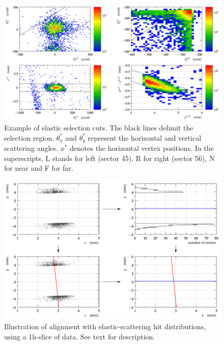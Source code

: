 \documentclass[TOTEM]{cern/cernphprep}
\begin{document}
\begin{figure}[h!]
\begin{center}
\includegraphics[width=1\hsize]{fig/calibration_fill/el_cut_example.pdf}
\caption{%
Example of elastic selection cuts. The black lines delimit the selection region. $\theta_x^*$ and $\theta_y^*$ represent the horizontal and vertical scattering angles. $x^*$ denotes the horizontal vertex positions. In the superscripts, L stands for left (sector 45), R for right (sector 56), N for near and F for far.
}
\label{fig:el_cuts}
\end{center}
\end{figure}

\begin{figure}[h!]
\begin{center}
\includegraphics[width=1\hsize]{fig/calibration_fill/el_alignment_method.pdf}
\caption{%
Illustration of alignment with elastic-scattering hit distributions, using a 1h-slice of data. See text for description.
}
\label{fig:el_alignment_method}
\end{center}
\end{figure}
\end{document}
